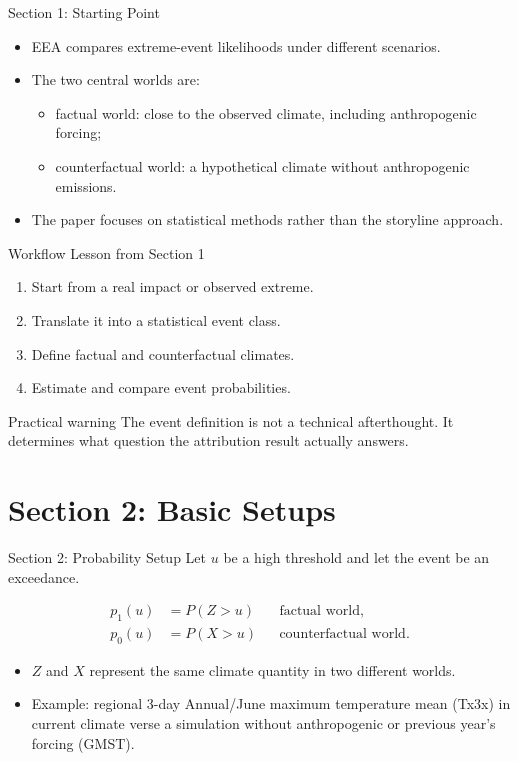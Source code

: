 \documentclass[aspectratio=169]{beamer}
\begin{document}
\begin{frame}{Section 1: Starting Point}
  \begin{itemize}
    \item EEA compares extreme-event likelihoods under different scenarios.
    \item The two central worlds are:
      \begin{itemize}
        \item factual world: close to the observed climate, including anthropogenic forcing;
        \item counterfactual world: a hypothetical climate without anthropogenic emissions.
      \end{itemize}
    \item The paper focuses on statistical methods rather than the storyline approach.
  \end{itemize}
\end{frame}

\begin{frame}{Workflow Lesson from Section 1}
  \begin{enumerate}
    \item Start from a real impact or observed extreme.
    \item Translate it into a statistical event class.
    \item Define factual and counterfactual climates.
    \item Estimate and compare event probabilities.
  \end{enumerate}

  \vspace{0.25cm}
  \begin{alertblock}{Practical warning}
    The event definition is not a technical afterthought. It determines what question the attribution result actually answers.
  \end{alertblock}
\end{frame}

\section{Section 2: Basic Setups}

\begin{frame}{Section 2: Probability Setup}
  Let $u$ be a high threshold and let the event be an exceedance.

  \begin{align*}
    p_1(u) &= P(Z > u) && \text{factual world}, \\
    p_0(u) &= P(X > u) && \text{counterfactual world}.
  \end{align*}

  \begin{itemize}
    \item $Z$ and $X$ represent the same climate quantity in two different worlds.
    \item Example: regional  3-day Annual/June maximum temperature mean (Tx3x) in 
    current climate verse a simulation without anthropogenic or previous year's forcing (GMST).
  \end{itemize}
\end{frame}
\end{document}
